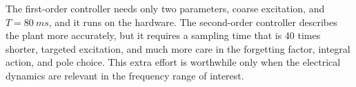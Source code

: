 The first-order controller needs only two parameters, coarse excitation, and
\(T=\SI{80}{ms}\), and it runs on the hardware. The second-order controller
describes the plant more accurately, but it requires a sampling time that is
40 times shorter, targeted excitation, and much more care in the forgetting
factor, integral action, and pole choice. This extra effort is worthwhile only
when the electrical dynamics are relevant in the frequency range of interest.
